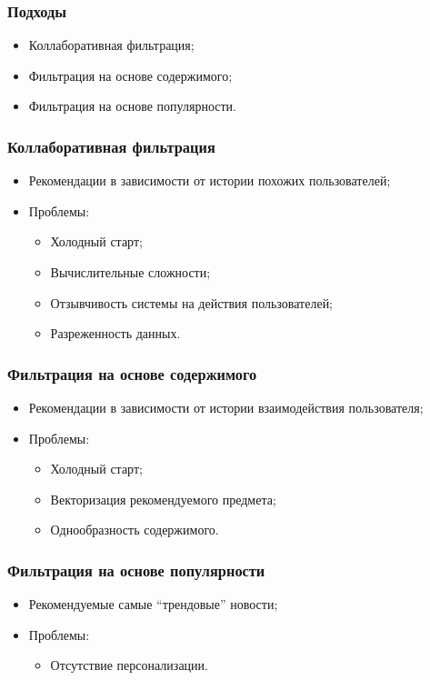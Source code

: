 \documentclass[xetex,mathserif,serif]{beamer}
\begin{document}
\begin{frame}
	\frametitle{Подходы}

	\begin{itemize}
		\item Коллаборативная фильтрация;
		\item Фильтрация на основе содержимого;
		\item Фильтрация на основе популярности.
	\end{itemize}
\end{frame}

\begin{frame}
	\frametitle{Коллаборативная фильтрация}

	\begin{itemize}
		\item Рекомендации в зависимости от истории похожих пользователей;
		\item Проблемы:
		      \begin{itemize}
			      \item Холодный старт;
			      \item Вычислительные сложности;
                  \item Отзывчивость системы на действия пользователей;
			      \item Разреженность данных.
		      \end{itemize}
	\end{itemize}
\end{frame}

\begin{frame}
	\frametitle{Фильтрация на основе содержимого}

	\begin{itemize}
		\item Рекомендации в зависимости от истории взаимодействия пользователя;
		\item Проблемы:
		      \begin{itemize}
			      \item Холодный старт;
			      \item Векторизация рекомендуемого предмета;
			      \item Однообразность содержимого.
		      \end{itemize}
	\end{itemize}
\end{frame}

\begin{frame}
	\frametitle{Фильтрация на основе популярности}

	\begin{itemize}
		\item Рекомендуемые самые ``трендовые'' новости;
		\item Проблемы:
		      \begin{itemize}
			      \item Отсутствие персонализации.
		      \end{itemize}
	\end{itemize}
\end{frame}
\end{document}
